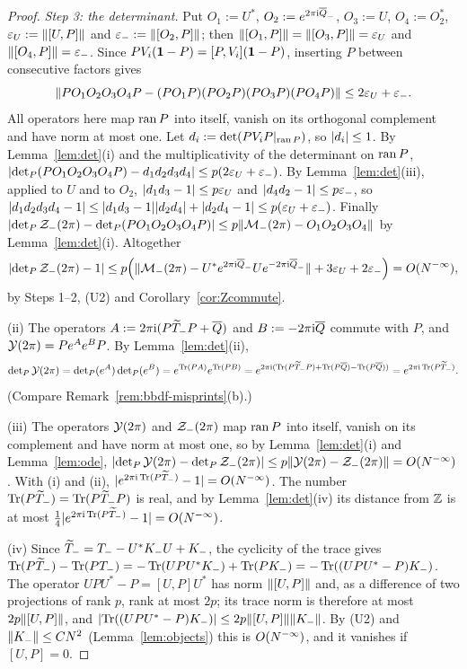 \begin{proof}
\emph{Step 3: the determinant.} Put $O_1:=U^*$, $O_2:=e^{2\pi\mathrm{i}\overline{Q}_-}$, $O_3:=U$, $O_4:=O_2^*$, $\varepsilon_U:=\lVert[U,P]\rVert$
and $\varepsilon_-:=\lVert[O_2,P]\rVert$; then $\lVert[O_1,P]\rVert=\lVert[O_3,P]\rVert=\varepsilon_U$ and $\lVert[O_4,P]\rVert=\varepsilon_-$. Since
$PV_i(\mathbf{1}-P)=[P,V_i](\mathbf{1}-P)$, inserting $P$ between consecutive factors gives
\[
\lVert PO_1O_2O_3O_4P-(PO_1P)(PO_2P)(PO_3P)(PO_4P)\rVert\le2\varepsilon_U+\varepsilon_- .
\]
All operators here map $\operatorname{ran} P$ into itself, vanish on its orthogonal complement and have norm at most one. Let
$d_i:=\det(PV_iP|_{\operatorname{ran} P})$, so $\lvert d_i\rvert\le1$. By Lemma~\ref{lem:det}(i) and the multiplicativity of the determinant on
$\operatorname{ran} P$, $\lvert\det\nolimits_{P}(PO_1O_2O_3O_4P)-d_1d_2d_3d_4\rvert\le p(2\varepsilon_U+\varepsilon_-)$. By Lemma~\ref{lem:det}(iii), applied to $U$
and to $O_2$, $\lvert d_1d_3-1\rvert\le p\varepsilon_U$ and $\lvert d_4d_2-1\rvert\le p\varepsilon_-$, so
$\lvert d_1d_2d_3d_4-1\rvert\le\lvert d_1d_3-1\rvert\lvert d_2d_4\rvert+\lvert d_2d_4-1\rvert\le p(\varepsilon_U+\varepsilon_-)$. Finally
$\lvert\det\nolimits_{P}\mathcal{Z}_{-}(2\pi)-\det\nolimits_{P}(PO_1O_2O_3O_4P)\rvert\le p\lVert\mathcal M_-(2\pi)-O_1O_2O_3O_4\rVert$ by Lemma~\ref{lem:det}(i). Altogether
\[
\lvert\det\nolimits_{P}\mathcal{Z}_{-}(2\pi)-1\rvert\le p\Bigl(\lVert\mathcal M_-(2\pi)-U^*e^{2\pi\mathrm{i}\overline{Q}_-}Ue^{-2\pi\mathrm{i}\overline{Q}_-}\rVert+3\varepsilon_U+2\varepsilon_-\Bigr)=O(N^{-\infty}),
\]
by Steps 1--2, (U2) and Corollary~\ref{cor:Zcommute}.

(ii) The operators $A:=2\pi\mathrm{i}(P\widetilde{T}_{-} P+\overline{Q})$ and $B:=-2\pi\mathrm{i}\overline{Q}$ commute with $P$, and $\mathcal{Y}(2\pi)=Pe^Ae^BP$. By
Lemma~\ref{lem:det}(ii),
\[
\det\nolimits_{P}\mathcal{Y}(2\pi)=\det\nolimits_{P}(e^A)\det\nolimits_{P}(e^B)=e^{\operatorname{Tr}(PA)}e^{\operatorname{Tr}(PB)}=e^{2\pi\mathrm{i}(\operatorname{Tr}(P\widetilde{T}_{-} P)+\operatorname{Tr}(P\overline{Q})-\operatorname{Tr}(P\overline{Q}))}=e^{2\pi\mathrm{i}\operatorname{Tr}(P\widetilde{T}_{-})} .
\]
(Compare Remark~\ref{rem:bbdf-misprints}(b).)

(iii) The operators $\mathcal{Y}(2\pi)$ and $\mathcal{Z}_{-}(2\pi)$ map $\operatorname{ran} P$ into itself, vanish on its complement and have norm at most
one, so by Lemma~\ref{lem:det}(i) and Lemma~\ref{lem:ode}, $\lvert\det\nolimits_{P}\mathcal{Y}(2\pi)-\det\nolimits_{P}\mathcal{Z}_{-}(2\pi)\rvert\le p\lVert\mathcal{Y}(2\pi)-\mathcal{Z}_{-}(2\pi)\rVert=O(N^{-\infty})$.
With (i) and (ii), $\lvert e^{2\pi\mathrm{i}\operatorname{Tr}(P\widetilde{T}_{-})}-1\rvert=O(N^{-\infty})$. The number $\operatorname{Tr}(P\widetilde{T}_{-})=\operatorname{Tr}(P\widetilde{T}_{-} P)$ is real, and by
Lemma~\ref{lem:det}(iv) its distance from $\mathbb{Z}$ is at most $\frac14\lvert e^{2\pi\mathrm{i}\operatorname{Tr}(P\widetilde{T}_{-})}-1\rvert=O(N^{-\infty})$.

(iv) Since $\widetilde{T}_{-}=T_--U^*K_-U+K_-$, the cyclicity of the trace gives
$\operatorname{Tr}(P\widetilde{T}_{-})-\operatorname{Tr}(PT_-)=-\operatorname{Tr}(UPU^*K_-)+\operatorname{Tr}(PK_-)=-\operatorname{Tr}((UPU^*-P)K_-)$. The operator $UPU^*-P=[U,P]U^*$ has norm
$\lVert[U,P]\rVert$ and, as a difference of two projections of rank $p$, rank at most $2p$; its trace norm is therefore at
most $2p\lVert[U,P]\rVert$, and $\lvert\operatorname{Tr}((UPU^*-P)K_-)\rvert\le2p\lVert[U,P]\rVert\lVert K_-\rVert$. By (U2) and $\lVert K_-\rVert\le CN^2$
(Lemma~\ref{lem:objects}) this is $O(N^{-\infty})$, and it vanishes if $[U,P]=0$.
\end{proof}

